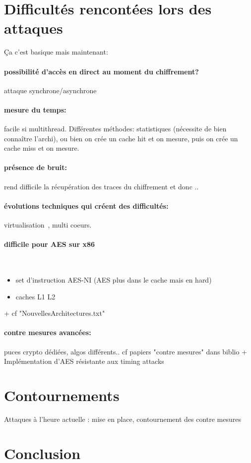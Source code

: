 \documentclass[a4paper,11pt]{article}
\begin{document}
\section{Difficultés rencontées lors des attaques} %
Ça c'est basique mais maintenant:

\paragraph{possibilité d'accès en direct au moment du chiffrement?} attaque synchrone/asynchrone~\cite{osvik2006cache} %
\paragraph{mesure du temps:} facile si multithread. Différentes méthodes: statistiques (nécessite de bien connaître l'archi), ou bien on crée un cache hit et on mesure, puis on crée un cache miss et on mesure. %
\paragraph{présence de bruit:} rend difficile la récupération des traces du chiffrement et donc .. %
\paragraph{évolutions techniques qui créent des difficultés:} virtualisation~\cite{weiss2012cache}, multi coeurs.  %
\paragraph{difficile pour AES sur x86}~\cite{mowery2012aes}  %
\begin{itemize}
\item set d'instruction AES-NI (AES plus dans le cache mais en hard)
\item caches L1 L2
\end{itemize}
+ cf "NouvellesArchitectures.txt"
\paragraph{contre mesures avancées:}  puces crypto dédiées, algos différents.. cf papiers "contre mesures" dans biblio + Implémentation d'AES résistante aux timing attacks~\cite{kasper2009faster} %

\section{Contournements}
Attaques à l'heure actuelle : mise en place, contournement des contre mesures %

\section*{Conclusion}

\newpage
\nocite{*}


\end{document}
